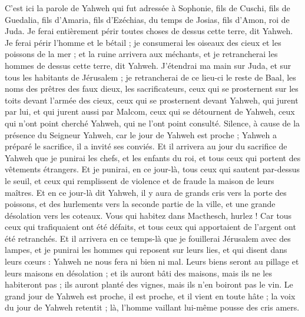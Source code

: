 \begin{multicols}{2}
\VerseOne{}C'est ici la parole de Yahweh qui fut adressée à Sophonie, fils de Cuschi, fils de Guedalia, fils d'Amaria, fils d'Ezéchias, du temps de Josias, fils d'Amon, roi de Juda.
Je ferai entièrement périr toutes choses de dessus cette terre, dit Yahweh.
Je ferai périr l'homme et le bétail ; je consumerai les oiseaux des cieux et les poissons de la mer ; et la ruine arrivera aux méchants, et je retrancherai les hommes de dessus cette terre, dit Yahweh.
J'étendrai ma main sur Juda, et sur tous les habitants de Jérusalem ; je retrancherai de ce lieu-ci le reste de Baal, les noms des prêtres des faux dieux, les sacrificateurs,
ceux qui se prosternent sur les toits devant l'armée des cieux, ceux qui se prosternent devant Yahweh,  qui jurent par lui, et qui jurent aussi par Malcom,
ceux qui se détournent de Yahweh, ceux qui n'ont point cherché Yahweh, qui ne l'ont point consulté.
Silence, à cause de la présence du Seigneur Yahweh, car le jour de Yahweh est proche ; Yahweh a préparé le sacrifice, il a invité ses conviés.
Et il arrivera au jour du sacrifice de Yahweh que je punirai les chefs, et les enfants du roi, et tous ceux qui portent des vêtements étrangers.
Et je punirai, en ce jour-là, tous ceux qui sautent par-dessus le seuil, et ceux qui remplissent de violence et de fraude la maison de leurs maîtres.
Et en ce jour-là dit Yahweh, il y aura de grands cris vers la porte des poissons, et des hurlements vers la seconde partie de la ville, et une grande désolation vers les coteaux.
Vous qui habitez dans Macthesch, hurlez ! Car tous ceux qui trafiquaient ont été défaits, et tous ceux qui apportaient de l'argent ont été retranchés.
Et il arrivera en ce temps-là que je fouillerai Jérusalem avec des lampes, et je punirai les hommes qui reposent sur leurs lies, et qui disent dans leurs cœurs : Yahweh ne nous fera ni bien ni mal.
Leurs biens seront au pillage et leurs maisons en désolation ; et ils auront bâti des maisons, mais ils ne les habiteront pas ; ils auront planté des vignes, mais ils n'en boiront pas le vin.
Le grand jour de Yahweh est proche, il est proche, et il vient en toute hâte ; la voix du jour de Yahweh retentit ; là, l’homme vaillant lui-même pousse des cris amers.

\end{multicols}

